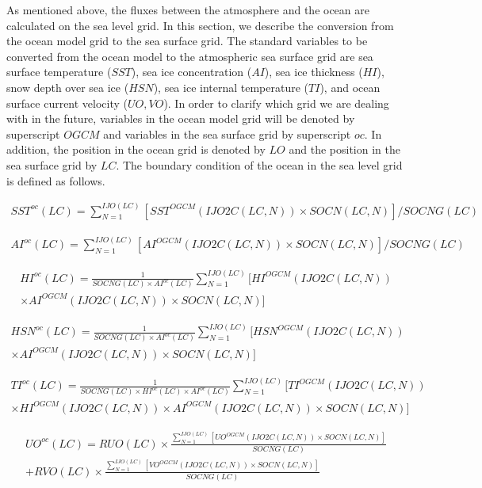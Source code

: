 As mentioned above, the fluxes between the atmosphere and the ocean are
calculated on the sea level grid. In this section, we describe the
conversion from the ocean model grid to the sea surface grid. The
standard variables to be converted from the ocean model to the
atmospheric sea surface grid are sea surface temperature (\(SST\)), sea
ice concentration (\(AI\)), sea ice thickness (\(HI\)), snow depth over
sea ice (\(HSN\)), sea ice internal temperature (\(TI\)), and ocean
surface current velocity (\(UO,VO\)). In order to clarify which grid we
are dealing with in the future, variables in the ocean model grid will
be denoted by superscript \(OGCM\) and variables in the sea surface grid
by superscript \(oc\). In addition, the position in the ocean grid is
denoted by \(LO\) and the position in the sea surface grid by \(LC\).
The boundary condition of the ocean in the sea level grid is defined as
follows.

\begin{eqnarray} SST^{oc}(LC) = \sum_{N=1}^{IJO(LC)}[SST^{OGCM}(IJO2C(LC,N)) \times SOCN(LC,N)]/SOCNG(LC) \end{eqnarray}

\begin{eqnarray} AI^{oc}(LC) = \sum_{N=1}^{IJO(LC)}[AI^{OGCM}(IJO2C(LC,N)) \times SOCN(LC,N)]/SOCNG(LC) \end{eqnarray}

\begin{eqnarray} HI^{oc}(LC) = \frac{1}{{SOCNG(LC) \times AI^{oc}(LC)}}\sum_{N=1}^{IJO(LC)}[HI^{OGCM}(IJO2C(LC,N)) \\ \times AI^{OGCM}(IJO2C(LC,N))   \times SOCN(LC,N)] \end{eqnarray}

\begin{eqnarray} HSN^{oc}(LC) = \frac{1}{{SOCNG(LC) \times AI^{oc}(LC)}}\sum_{N=1}^{IJO(LC)}[HSN^{OGCM}(IJO2C(LC,N)) \\ \times AI^{OGCM}(IJO2C(LC,N)) \times SOCN(LC,N)] \end{eqnarray}

\begin{eqnarray} TI^{oc}(LC) = \frac{1}{{SOCNG(LC) \times HI^{oc}(LC) \times AI^{oc}(LC)}}  \sum_{N=1}^{IJO(LC)}[TI^{OGCM}(IJO2C(LC,N)) \\ \times HI^{OGCM}(IJO2C(LC,N)) \times AI^{OGCM}(IJO2C(LC,N)) \times SOCN(LC,N)]  \end{eqnarray}

\begin{eqnarray} UO^{oc}(LC)= RUO(LC) \times  \frac{\sum_{N=1}^{IJO(LC)}[UO^{OGCM}(IJO2C(LC,N)) \times SOCN(LC,N)]}{SOCNG(LC)}  \\ + RVO(LC) \times  \frac{\sum_{N=1}^{IJO(LC)}[VO^{OGCM}(IJO2C(LC,N)) \times SOCN(LC,N)]}{SOCNG(LC)} \end{eqnarray}


